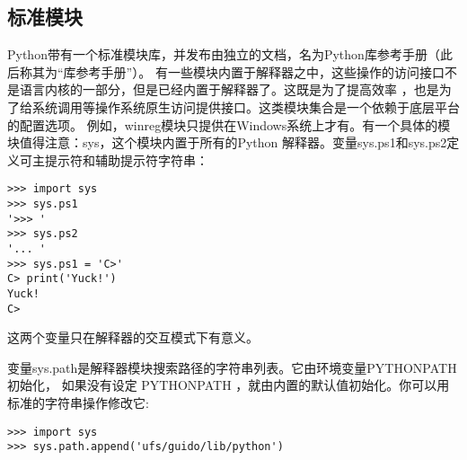 \documentclass[UTF8]{ctexart}
\begin{document}
\subsection{标准模块}
Python带有一个标准模块库，并发布由独立的文档，名为Python库参考手册（此后称其为``库参考手册''）。
有一些模块内置于解释器之中，这些操作的访问接口不是语言内核的一部分，但是已经内置于解释器了。这既是为了提高效率
，也是为了给系统调用等操作系统原生访问提供接口。这类模块集合是一个依赖于底层平台的配置选项。
例如，winreg模块只提供在Windows系统上才有。有一个具体的模块值得注意：sys，这个模块内置于所有的Python
解释器。变量sys.ps1和sys.ps2定义可主提示符和辅助提示符字符串：
\begin{verbatim}
>>> import sys
>>> sys.ps1
'>>> '
>>> sys.ps2
'... '
>>> sys.ps1 = 'C>'
C> print('Yuck!')
Yuck!
C>
\end{verbatim}

这两个变量只在解释器的交互模式下有意义。

变量sys.path是解释器模块搜索路径的字符串列表。它由环境变量PYTHONPATH 初始化，
如果没有设定 PYTHONPATH ，就由内置的默认值初始化。你可以用标准的字符串操作修改它:
\begin{verbatim}
>>> import sys
>>> sys.path.append('ufs/guido/lib/python')
\end{verbatim}
\end{document}
